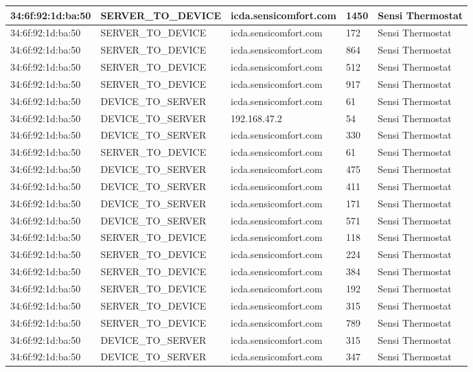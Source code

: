 \begin{table*}[t!]
\begin{tabularx}{\textwidth}{p{3cm} p{4cm} p{4cm} p{2cm} p{2cm}}
34:6f:92:1d:ba:50 &	SERVER\_TO\_DEVICE &	icda.sensicomfort.com &	1450 & Sensi Thermostat \\ \hline
34:6f:92:1d:ba:50 &	SERVER\_TO\_DEVICE &	icda.sensicomfort.com &	172	 & Sensi Thermostat \\ \hline
34:6f:92:1d:ba:50 &	SERVER\_TO\_DEVICE &	icda.sensicomfort.com &	864	 & Sensi Thermostat \\ \hline
34:6f:92:1d:ba:50 &	SERVER\_TO\_DEVICE &	icda.sensicomfort.com &	512	 & Sensi Thermostat \\ \hline
34:6f:92:1d:ba:50 &	SERVER\_TO\_DEVICE &	icda.sensicomfort.com &	917	 & Sensi Thermostat \\ \hline
34:6f:92:1d:ba:50 &	DEVICE\_TO\_SERVER &	icda.sensicomfort.com &	61	 & Sensi Thermostat \\ \hline
34:6f:92:1d:ba:50 &	DEVICE\_TO\_SERVER &	192.168.47.2		  &	54	 & Sensi Thermostat \\ \hline
34:6f:92:1d:ba:50 &	DEVICE\_TO\_SERVER &	icda.sensicomfort.com &	330	 & Sensi Thermostat \\ \hline
34:6f:92:1d:ba:50 &	SERVER\_TO\_DEVICE &	icda.sensicomfort.com &	61	 & Sensi Thermostat \\ \hline
34:6f:92:1d:ba:50 &	DEVICE\_TO\_SERVER &	icda.sensicomfort.com &	475	 & Sensi Thermostat \\ \hline
34:6f:92:1d:ba:50 &	DEVICE\_TO\_SERVER &	icda.sensicomfort.com &	411	 & Sensi Thermostat \\ \hline
34:6f:92:1d:ba:50 &	DEVICE\_TO\_SERVER &	icda.sensicomfort.com &	171	 & Sensi Thermostat \\ \hline
34:6f:92:1d:ba:50 &	DEVICE\_TO\_SERVER &	icda.sensicomfort.com &	571	 & Sensi Thermostat \\ \hline
34:6f:92:1d:ba:50 &	SERVER\_TO\_DEVICE &	icda.sensicomfort.com &	118  & Sensi Thermostat \\ \hline
34:6f:92:1d:ba:50 &	SERVER\_TO\_DEVICE &	icda.sensicomfort.com &	224	 & Sensi Thermostat \\ \hline
34:6f:92:1d:ba:50 &	SERVER\_TO\_DEVICE &	icda.sensicomfort.com &	384	 & Sensi Thermostat \\ \hline
34:6f:92:1d:ba:50 &	SERVER\_TO\_DEVICE &	icda.sensicomfort.com &	192	 & Sensi Thermostat \\ \hline
34:6f:92:1d:ba:50 &	SERVER\_TO\_DEVICE &	icda.sensicomfort.com &	315	 & Sensi Thermostat \\ \hline
34:6f:92:1d:ba:50 &	SERVER\_TO\_DEVICE &	icda.sensicomfort.com &	789	 & Sensi Thermostat \\ \hline
34:6f:92:1d:ba:50 &	DEVICE\_TO\_SERVER &	icda.sensicomfort.com &	315	 & Sensi Thermostat \\ \hline
34:6f:92:1d:ba:50 &	DEVICE\_TO\_SERVER &	icda.sensicomfort.com &	347	 & Sensi Thermostat \\ 
\bottomrule
\end{tabularx}
\vspace{-1em}
    \label{tab: sensi thermostat profile detailed}
\end{table*}


